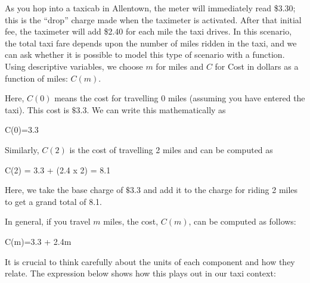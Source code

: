 \documentclass[
  letterpaper,
  DIV=11,
  numbers=noendperiod]{scrreprt}
\newenvironment{Shaded}{\begin{snugshade}}{\end{snugshade}}
\newcommand{\DataTypeTok}[1]{\textcolor[rgb]{0.68,0.00,0.00}{#1}}
\newcommand{\ErrorTok}[1]{\textcolor[rgb]{0.68,0.00,0.00}{#1}}
\newcommand{\FloatTok}[1]{\textcolor[rgb]{0.68,0.00,0.00}{#1}}
\newcommand{\KeywordTok}[1]{\textcolor[rgb]{0.00,0.23,0.31}{#1}}
\newcommand{\OperatorTok}[1]{\textcolor[rgb]{0.37,0.37,0.37}{#1}}
\begin{document}
As you hop into a taxicab in Allentown, the meter will immediately read
\$3.30; this is the ``drop'' charge made when the taximeter is
activated. After that initial fee, the taximeter will add \$2.40 for
each mile the taxi drives. In this scenario, the total taxi fare depends
upon the number of miles ridden in the taxi, and we can ask whether it
is possible to model this type of scenario with a function. Using
descriptive variables, we choose \(m\) for miles and \(C\) for Cost in
dollars as a function of miles: \(C(m)\).

Here, \(C(0)\) means the cost for travelling 0 miles (assuming you have
entered the taxi). This cost is \(\$3.3\). We can write this
mathematically as

\begin{Shaded}
\begin{Highlighting}[]
\DataTypeTok{C}\ErrorTok{(}\DataTypeTok{0}\ErrorTok{)}\OperatorTok{=}\FloatTok{3.3}
\end{Highlighting}
\end{Shaded}

Similarly, \(C(2)\) is the cost of travelling 2 miles and can be
computed as

\begin{Shaded}
\begin{Highlighting}[]
\DataTypeTok{C}\ErrorTok{(}\DataTypeTok{2}\ErrorTok{)} \OperatorTok{=} \FloatTok{3.3} \ErrorTok{+} \ErrorTok{(}\DataTypeTok{2}\KeywordTok{.}\DataTypeTok{4} \DataTypeTok{x} \DataTypeTok{2}\ErrorTok{)} \OperatorTok{=} \FloatTok{8.1}
\end{Highlighting}
\end{Shaded}

Here, we take the base charge of \(\$3.3\) and add it to the charge for
riding 2 miles to get a grand total of 8.1.

In general, if you travel \(m\) miles, the cost, \(C(m)\), can be
computed as follows:

\begin{Shaded}
\begin{Highlighting}[]
\DataTypeTok{C}\ErrorTok{(}\DataTypeTok{m}\ErrorTok{)}\OperatorTok{=}\FloatTok{3.3} \ErrorTok{+} \DataTypeTok{2}\KeywordTok{.}\DataTypeTok{4m}
\end{Highlighting}
\end{Shaded}

It is crucial to think carefully about the units of each component and
how they relate. The expression below shows how this plays out in our
taxi context:
\end{document}
